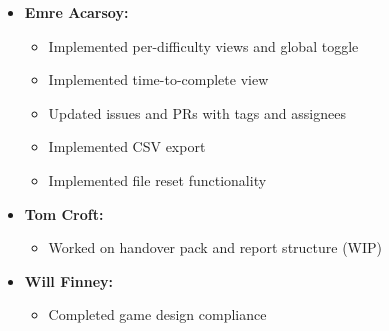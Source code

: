 \documentclass[11pt]{article}
\begin{document}
\begin{itemize}
        \item \textbf{Emre Acarsoy:}
        \begin{itemize}
            \item Implemented per-difficulty views and global toggle
            \item Implemented time-to-complete view
            \item Updated issues and PRs with tags and assignees
            \item Implemented CSV export
            \item Implemented file reset functionality
        \end{itemize}

        \item \textbf{Tom Croft:}
        \begin{itemize}
            \item Worked on handover pack and report structure (WIP)
        \end{itemize}

        \item \textbf{Will Finney:}
        \begin{itemize}
            \item Completed game design compliance
        \end{itemize}
    \end{itemize}
\end{document}
